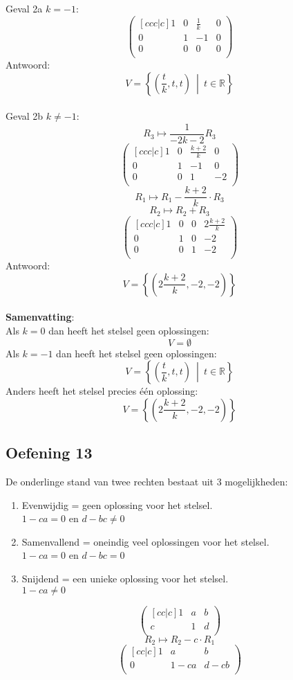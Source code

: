 \documentclass[lineaire_algebra_oplossingen.tex]{subfiles}
\begin{document}
Geval 2a $k=-1$:
\[
\begin{pmatrix}[ccc|c]
1 & 0 & \frac{1}{k} & 0\\
0 & 1 & -1 & 0\\
0 & 0 & 0 & 0\\
\end{pmatrix}
\]
Antwoord:
\[
V=\left\{\left(\frac{t}{k},t,t\right)\ \middle|\ t \in \mathbb{R}\right\}
\]\\
Geval 2b $k\neq-1$:
\[ R_3 \longmapsto \frac{1}{-2k-2}R_3\]
\[
\begin{pmatrix}[ccc|c]
1 & 0 & \frac{k+2}{k} & 0\\
0 & 1 & -1 & 0\\
0 & 0 & 1 & -2\\
\end{pmatrix}
\]
\[ R_1 \longmapsto R_1 - \frac{k+2}{k}\cdot R_3 \]
\[ R_2 \longmapsto R_2 + R_3 \]
\[
\begin{pmatrix}[ccc|c]
1 & 0 & 0 & 2\frac{k+2}{k}\\
0 & 1 & 0 & -2\\
0 & 0 & 1 & -2\\
\end{pmatrix}
\]
Antwoord:
\[
V=\left\lbrace\left(2\frac{k+2}{k},-2,-2\right)\right\rbrace
\]\\
\textbf{Samenvatting}:\\
Als $k=0$ dan heeft het stelsel geen oplossingen:
\[
V=\emptyset
\]
Als $k=-1$ dan heeft het stelsel geen oplossingen:
\[
V=\left\lbrace\left(\frac{t}{k},t,t\right)\ \middle|\ t \in \mathbb{R}\right\rbrace
\]
Anders heeft het stelsel precies \'e\'en oplossing:
\[
V=\left\lbrace\left(2\frac{k+2}{k},-2,-2\right)\right\rbrace
\]

\subsection{Oefening 13}
De onderlinge stand van twee rechten bestaat uit 3 mogelijkheden:
\begin{enumerate}
\item Evenwijdig = geen oplossing voor het stelsel.\\
$1-ca = 0$ en $ d -bc \neq 0$
\item Samenvallend = oneindig veel oplossingen voor het stelsel.\\
$1-ca = 0$ en $ d -bc = 0$
\item Snijdend = een unieke oplossing voor het stelsel.\\
$1-ca \neq 0$
\end{enumerate}
\[
\begin{pmatrix}[cc|c]
1 & a & b\\
c & 1 & d\\
\end{pmatrix}
\]
\[ R_2 \longmapsto R_2 - c \cdot R_1\]
\[
\begin{pmatrix}[cc|c]
1 & a & b\\
0 & 1-ca & d-cb\\
\end{pmatrix}
\]
\end{document}
